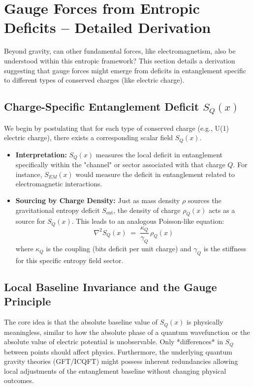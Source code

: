 \documentclass[11pt]{article}
\begin{document}
\section{Gauge Forces from Entropic Deficits – Detailed Derivation}\label{sec:gauge_app3}

Beyond gravity, can other fundamental forces, like electromagnetism, also be understood within this entropic framework? This section details a derivation suggesting that gauge forces might emerge from deficits in entanglement specific to different types of conserved charges (like electric charge).

\subsection{Charge-Specific Entanglement Deficit $S_Q(x)$}

We begin by postulating that for each type of conserved charge (e.g., U(1) electric charge), there exists a corresponding scalar field $S_Q(x)$.
\begin{itemize}
    \item \textbf{Interpretation:} $S_Q(x)$ measures the local deficit in entanglement specifically within the "channel" or sector associated with that charge $Q$. For instance, $S_{EM}(x)$ would measure the deficit in entanglement related to electromagnetic interactions.
    \item \textbf{Sourcing by Charge Density:} Just as mass density $\rho$ sources the gravitational entropy deficit $S_{\mathrm{ent}}$, the density of charge $\rho_Q(x)$ acts as a source for $S_Q(x)$. This leads to an analogous Poisson-like equation:
    \begin{equation}
    \nabla^2 S_Q(x) \;=\; \frac{\kappa_Q}{\gamma_Q}\,\rho_Q(x) \label{eq:Poisson_Q_app}
    \end{equation}
    where $\kappa_Q$ is the coupling (bits deficit per unit charge) and $\gamma_Q$ is the stiffness for this specific entropy field sector.
\end{itemize}

\subsection{Local Baseline Invariance and the Gauge Principle}

The core idea is that the absolute baseline value of $S_Q(x)$ is physically meaningless, similar to how the absolute phase of a quantum wavefunction or the absolute value of electric potential is unobservable. Only *differences* in $S_Q$ between points should affect physics. Furthermore, the underlying quantum gravity theories (GFT/ICQFT) might possess inherent redundancies allowing local adjustments of the entanglement baseline without changing physical outcomes.
\end{document}
